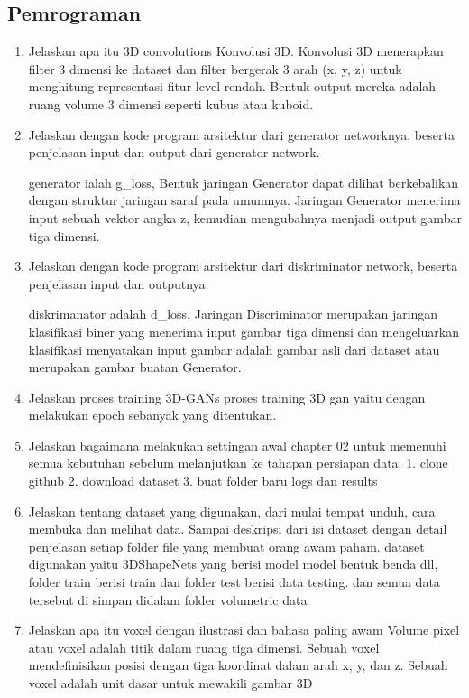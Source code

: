 \subsection{Pemrograman}
\begin{enumerate}
\item Jelaskan apa itu 3D convolutions
Konvolusi 3D. Konvolusi 3D menerapkan filter 3 dimensi ke dataset dan filter bergerak 3 arah (x, y, z) untuk menghitung representasi fitur level rendah. Bentuk output mereka adalah ruang volume 3 dimensi seperti kubus atau kuboid.

\item Jelaskan dengan kode program arsitektur dari generator networknya, beserta penjelasan input dan output dari generator network.

generator ialah g\_loss, Bentuk jaringan Generator dapat dilihat berkebalikan dengan struktur jaringan saraf pada umumnya. Jaringan Generator menerima input sebuah vektor angka z, kemudian mengubahnya menjadi output gambar tiga dimensi.

\item Jelaskan dengan kode program arsitektur dari diskriminator network, beserta penjelasan input dan outputnya.

diskrimanator adalah d\_loss, Jaringan Discriminator merupakan jaringan klasifikasi biner yang menerima input gambar tiga dimensi dan mengeluarkan klasifikasi menyatakan input gambar adalah gambar asli dari dataset atau merupakan gambar buatan Generator.

\item Jelaskan proses training 3D-GANs
proses training 3D gan yaitu dengan melakukan epoch sebanyak yang ditentukan.

\item Jelaskan bagaimana melakukan settingan awal chapter 02 untuk memenuhi semua kebutuhan sebelum melanjutkan ke tahapan persiapan data.
1. clone github 2. download dataset 3. buat folder baru logs dan results

\item Jelaskan tentang dataset yang digunakan, dari mulai tempat unduh, cara membuka dan melihat data. Sampai deskripsi dari isi dataset dengan detail penjelasan setiap folder file yang membuat orang awam paham.
dataset digunakan yaitu 3DShapeNets yang berisi model model bentuk benda dll, folder train berisi train dan folder test berisi data testing. dan semua data tersebut di simpan didalam folder volumetric data 

\item Jelaskan apa itu voxel dengan ilustrasi dan bahasa paling awam
Volume pixel atau voxel adalah titik dalam ruang tiga dimensi. Sebuah voxel mendefinisikan posisi dengan tiga koordinat dalam arah x, y, dan z. Sebuah voxel adalah unit dasar untuk mewakili gambar 3D


\end{enumerate}
